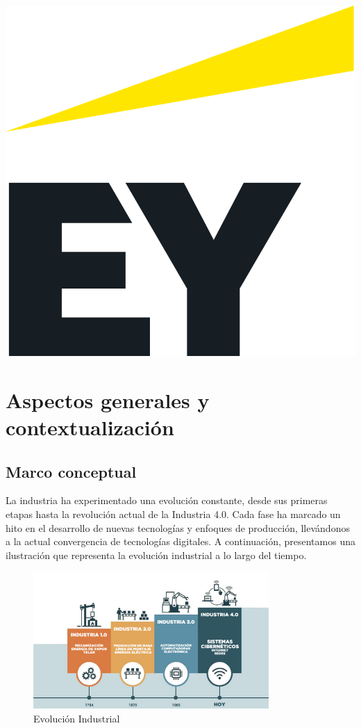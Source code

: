 \documentclass{article}
\begin{document}
\begin{center}
    \includegraphics[scale=0.2]{images/EY_logo.png}
\end{center}

\section{Aspectos generales y contextualización}

\subsection{Marco conceptual}

La industria ha experimentado una evolución constante, desde sus primeras etapas hasta la revolución actual de la Industria 4.0. Cada fase ha marcado un hito en el desarrollo de nuevas tecnologías y enfoques de producción, llevándonos a la actual convergencia de tecnologías digitales. A continuación, presentamos una ilustración que representa la evolución industrial a lo largo del tiempo.

\begin{center}
\begin{figure}[h]
  \centering
  \includegraphics[width=0.8\textwidth]{images/industria.png}
  \caption{Evolución Industrial}
\end{figure}    
\end{center}
\end{document}
